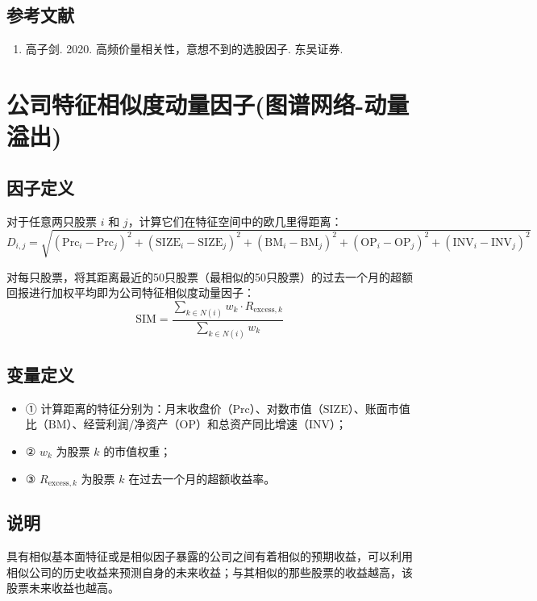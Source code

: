 \documentclass{article}
\begin{document}
\subsection{参考文献}
\begin{enumerate}
    \item 高子剑. 2020. 高频价量相关性，意想不到的选股因子. 东吴证券.
\end{enumerate}

\section{公司特征相似度动量因子(图谱网络-动量溢出)}

\subsection{因子定义}

对于任意两只股票 \(i\) 和 \(j\)，计算它们在特征空间中的欧几里得距离：
\begin{equation}
    D_{i,j} = \sqrt{(\mathrm{Prc}_i - \mathrm{Prc}_j)^2 + (\mathrm{SIZE}_i - \mathrm{SIZE}_j)^2 + (\mathrm{BM}_i - \mathrm{BM}_j)^2 + (\mathrm{OP}_i - \mathrm{OP}_j)^2 + (\mathrm{INV}_i - \mathrm{INV}_j)^2}
\end{equation}

对每只股票，将其距离最近的50只股票（最相似的50只股票）的过去一个月的超额回报进行加权平均即为公司特征相似度动量因子：
\begin{equation}
    \mathrm{SIM} = \frac{\sum_{k \in N(i)} w_k \cdot R_{\mathrm{excess},k}}{\sum_{k \in N(i)} w_k}
\end{equation}

\subsection{变量定义}
\begin{itemize}
    \item ① 计算距离的特征分别为：月末收盘价（\(\mathrm{Prc}\)）、对数市值（\(\mathrm{SIZE}\)）、账面市值比（\(\mathrm{BM}\)）、经营利润/净资产（\(\mathrm{OP}\)）和总资产同比增速（\(\mathrm{INV}\)）；
    \item ② \(w_k\) 为股票 \(k\) 的市值权重；
    \item ③ \(R_{\mathrm{excess},k}\) 为股票 \(k\) 在过去一个月的超额收益率。
\end{itemize}

\subsection{说明}
具有相似基本面特征或是相似因子暴露的公司之间有着相似的预期收益，可以利用相似公司的历史收益来预测自身的未来收益；与其相似的那些股票的收益越高，该股票未来收益也越高。
\end{document}
